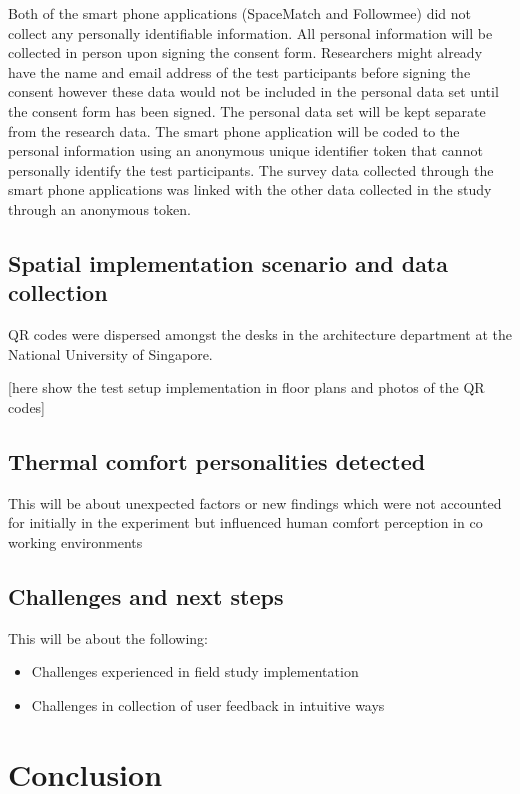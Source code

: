 \documentclass[]{interact}
\theoremstyle{plain}%
\theoremstyle{definition}
\theoremstyle{remark}
\begin{document}
Both of the smart phone applications (SpaceMatch and Followmee) did not collect any personally identifiable information. All personal information will be collected in person upon signing the consent form. Researchers might already have the name and email address of the test participants before signing the consent however these data would not be included in the personal data set until the consent form has been signed. The personal data set will be kept separate from the research data. The smart phone application will be coded to the personal information using an anonymous unique identifier token that cannot personally identify the test participants. The survey data collected through the smart phone applications was linked with the other data collected in the study through an anonymous token.

\subsection{Spatial implementation scenario and data collection}

QR codes were dispersed amongst the desks in the architecture department at the National University of Singapore.

[here show the test setup implementation in floor plans and photos of the QR codes]

\subsection{Thermal comfort personalities detected}

This will be about unexpected factors or new findings which were not accounted for initially in the experiment but influenced human comfort perception in co working environments

\subsection{Challenges and next steps}

This will be about the following:
\begin{itemize}
  \item Challenges experienced in field study implementation
  \item Challenges in collection of user feedback in intuitive ways
 \end{itemize}

\section{Conclusion}
\end{document}
